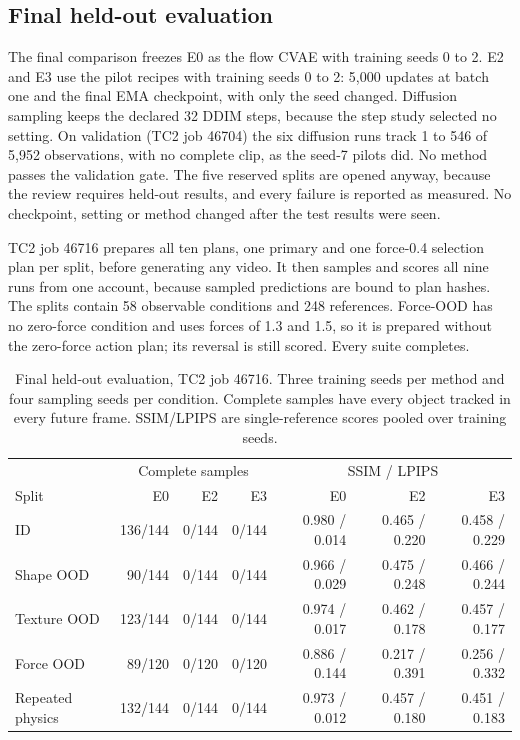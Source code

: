 \documentclass[11pt,a4paper]{article}
\begin{document}
\clearpage
\subsection{Final held-out evaluation}
\label{sec:final}
The final comparison freezes E0 as the flow CVAE with training seeds 0 to 2. E2 and E3 use the pilot recipes with training seeds 0 to 2: 5,000 updates at batch one and the final EMA checkpoint, with only the seed changed. Diffusion sampling keeps the declared 32 DDIM steps, because the step study selected no setting. On validation (TC2 job 46704) the six diffusion runs track 1 to 546 of 5,952 observations, with no complete clip, as the seed-7 pilots did. No method passes the validation gate. The five reserved splits are opened anyway, because the review requires held-out results, and every failure is reported as measured. No checkpoint, setting or method changed after the test results were seen.

TC2 job 46716 prepares all ten plans, one primary and one force-0.4 selection plan per split, before generating any video. It then samples and scores all nine runs from one account, because sampled predictions are bound to plan hashes. The splits contain 58 observable conditions and 248 references. Force-OOD has no zero-force condition and uses forces of 1.3 and 1.5, so it is prepared without the zero-force action plan; its reversal is still scored. Every suite completes.

\begin{table}[!ht]
\centering
\small
\setlength{\tabcolsep}{4pt}
\begin{tabular}{lrrrrrr}
\hline
 & \multicolumn{3}{c}{Complete samples} & \multicolumn{3}{c}{SSIM / LPIPS} \\
Split & E0 & E2 & E3 & E0 & E2 & E3 \\
\hline
ID & 136/144 & 0/144 & 0/144 & 0.980 / 0.014 & 0.465 / 0.220 & 0.458 / 0.229 \\
Shape OOD & 90/144 & 0/144 & 0/144 & 0.966 / 0.029 & 0.475 / 0.248 & 0.466 / 0.244 \\
Texture OOD & 123/144 & 0/144 & 0/144 & 0.974 / 0.017 & 0.462 / 0.178 & 0.457 / 0.177 \\
Force OOD & 89/120 & 0/120 & 0/120 & 0.886 / 0.144 & 0.217 / 0.391 & 0.256 / 0.332 \\
Repeated physics & 132/144 & 0/144 & 0/144 & 0.973 / 0.012 & 0.457 / 0.180 & 0.451 / 0.183 \\
\hline
\end{tabular}
\caption{Final held-out evaluation, TC2 job 46716. Three training seeds per method and four sampling seeds per condition. Complete samples have every object tracked in every future frame. SSIM/LPIPS are single-reference scores pooled over training seeds.}
\label{tab:final}
\end{table}
\end{document}
